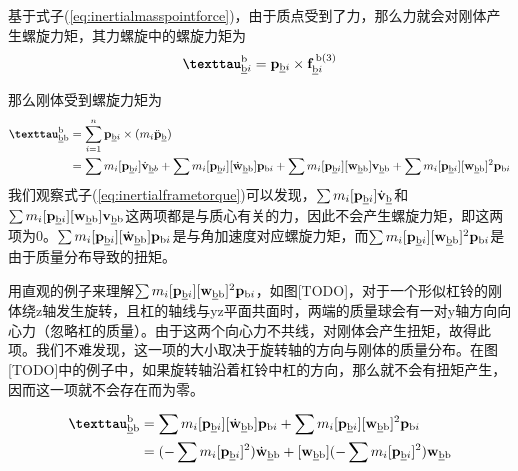 \documentclass[12pt, a4paper, article, UTF8]{ctexart}
\begin{document}
基于式子(\ref{eq:inertialmasspointforce})，由于质点受到了力，那么力就会对刚体产生螺旋力矩，其力螺旋中的螺旋力矩为
\begin{align}
\textbf{\texttau}_{\text{\underline{b}}i}^{\text{b}} = \mathbf{p}_{\text{\underline{b}}i} \times \mathbf{f}^{\,\text{b}(3)}_{\text{\underline{b}}i} 
\end{align}

那么刚体受到螺旋力矩为
\begin{align}
\textbf{\texttau}_{\text{\underline{b}b}}^{\text{b}} &= \sum_{i=1}^{n} \mathbf{p}_{\text{\underline{b}}i} \times (m_i \ddot{\mathbf{p}}_{\text{\underline{b}}}) \nonumber \\
&= \sum m_i [\mathbf{p}_{\text{\underline{b}}i}]  \dot{\mathbf{v}}_{\text{\underline{b}}b} + \sum m_i [\mathbf{p}_{\text{\underline{b}}i}][\dot{\mathbf{w}}_{\text{\underline{b}b}}] \mathbf{p}_{\text{b}i} + \sum m_i [\mathbf{p}_{\text{\underline{b}}i}][\mathbf{w}_{\text{\underline{b}b}} ] \mathbf{v}_{\text{\underline{b}b}} +  \sum m_i [\mathbf{p}_{\text{\underline{b}}i}] [\mathbf{w}_{\text{\underline{b}b}} ]^2 \mathbf{p}_{\text{b}i} 
 \label{eq:inertialframetorque}
\end{align}
我们观察式子(\ref{eq:inertialframetorque})可以发现，$\sum m_i [\mathbf{p}_{\text{\underline{b}}i}]  \dot{\mathbf{v}}_{\text{\underline{b}}}$和$\sum m_i [\mathbf{p}_{\text{\underline{b}}i}][\mathbf{w}_{\text{\underline{b}b}} ] \mathbf{v}_{\text{\underline{b}b}}$这两项都是与质心有关的力，因此不会产生螺旋力矩，即这两项为0。$\sum m_i [\mathbf{p}_{\text{\underline{b}}i}][\dot{\mathbf{w}}_{\text{\underline{b}b}}] \mathbf{p}_{\text{b}i}$是与角加速度对应螺旋力矩，而$\sum m_i [\mathbf{p}_{\text{\underline{b}}i}] [\mathbf{w}_{\text{\underline{b}b}} ]^2 \mathbf{p}_{\text{b}i}$是由于质量分布导致的扭矩。

用直观的例子来理解$\sum m_i [\mathbf{p}_{\text{\underline{b}}i}] [\mathbf{w}_{\text{\underline{b}b}} ]^2 \mathbf{p}_{\text{b}i}$，如图[TODO]，对于一个形似杠铃的刚体绕z轴发生旋转，且杠的轴线与yz平面共面时，两端的质量球会有一对y轴方向向心力（忽略杠的质量）。由于这两个向心力不共线，对刚体会产生扭矩，故得此项。我们不难发现，这一项的大小取决于旋转轴的方向与刚体的质量分布。在图[TODO]中的例子中，如果旋转轴沿着杠铃中杠的方向，那么就不会有扭矩产生，因而这一项就不会存在而为零。

\begin{align}
\textbf{\texttau}_{\text{\underline{b}b}}^{\text{b}} &=
 \sum m_i [\mathbf{p}_{\text{\underline{b}}i}][\dot{\mathbf{w}}_{\text{\underline{b}b}}] \mathbf{p}_{\text{b}i}  +  \sum m_i [\mathbf{p}_{\text{\underline{b}}i}] [\mathbf{w}_{\text{\underline{b}b}} ]^2 \mathbf{p}_{\text{b}i} \nonumber \\
&= (-\sum m_i [\mathbf{p}_{\text{\underline{b}}i}]^2 )\dot{\mathbf{w}}_{\text{\underline{b}b}} + [\mathbf{w}_{\text{\underline{b}b}} ](-\sum m_i [\mathbf{p}_{\text{\underline{b}}i}]^2 )\mathbf{w}_{\text{\underline{b}b}} \label{eq:torqueinertialframe2}
\end{align}
\end{document}
